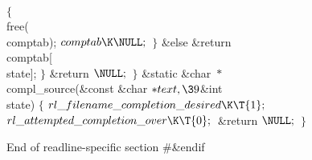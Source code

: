 ${}\{{}$\1\6
\\{free}(\\{comptab});\6
${}\\{comptab}\K\NULL;{}$\6
\4${}\}{}$\2\6
\&{else}\1\5
\&{return} \\{comptab}[\\{state}];\2\6
\4${}\}{}$\2\6
\&{return} ${}\NULL;{}$\6
\4${}\}{}$\2\7
\&{static} \&{char} ${}{*}{}$\\{compl\_source}(\&{const} \&{char} ${}{*}%
\\{text},\39{}$\&{int} \\{state})\1\1\2\2\6
${}\{{}$\1\6
${}\\{rl\_filename\_completion\_desired}\K\T{1};{}$\6
${}\\{rl\_attempted\_completion\_over}\K\T{0};{}$\6
\&{return} ${}\NULL;{}$\6
\4${}\}{}$\2\par
\fi

End of readline-specific section
\Y\B\8\#\&{endif}\par
\fi

